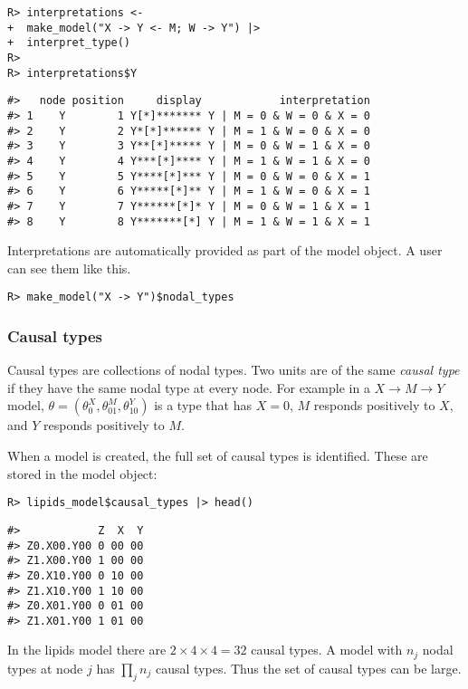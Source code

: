 \documentclass[
  11pt,
  article]{jss}
\begin{document}
\begin{verbatim}
R> interpretations <- 
+  make_model("X -> Y <- M; W -> Y") |> 
+  interpret_type()
R> 
R> interpretations$Y
\end{verbatim}

\begin{verbatim}
#>   node position     display            interpretation
#> 1    Y        1 Y[*]******* Y | M = 0 & W = 0 & X = 0
#> 2    Y        2 Y*[*]****** Y | M = 1 & W = 0 & X = 0
#> 3    Y        3 Y**[*]***** Y | M = 0 & W = 1 & X = 0
#> 4    Y        4 Y***[*]**** Y | M = 1 & W = 1 & X = 0
#> 5    Y        5 Y****[*]*** Y | M = 0 & W = 0 & X = 1
#> 6    Y        6 Y*****[*]** Y | M = 1 & W = 0 & X = 1
#> 7    Y        7 Y******[*]* Y | M = 0 & W = 1 & X = 1
#> 8    Y        8 Y*******[*] Y | M = 1 & W = 1 & X = 1
\end{verbatim}

Interpretations are automatically provided as part of the model object.
A user can see them like this.

\begin{verbatim}
R> make_model("X -> Y")$nodal_types
\end{verbatim}

\hypertarget{causal-types}{%
\subsubsection{Causal types}\label{causal-types}}

Causal types are collections of nodal types. Two units are of the same
\emph{causal type} if they have the same nodal type at every node. For
example in a \(X \rightarrow M \rightarrow Y\) model,
\(\theta = (\theta^X_0, \theta^M_{01}, \theta^Y_{10})\) is a type that
has \(X=0\), \(M\) responds positively to \(X\), and \(Y\) responds
positively to \(M\).

When a model is created, the full set of causal types is identified.
These are stored in the model object:

\begin{verbatim}
R> lipids_model$causal_types |> head()
\end{verbatim}

\begin{verbatim}
#>            Z  X  Y
#> Z0.X00.Y00 0 00 00
#> Z1.X00.Y00 1 00 00
#> Z0.X10.Y00 0 10 00
#> Z1.X10.Y00 1 10 00
#> Z0.X01.Y00 0 01 00
#> Z1.X01.Y00 1 01 00
\end{verbatim}

In the lipids model there are \(2\times 4\times 4 = 32\) causal types. A
model with \(n_j\) nodal types at node \(j\) has \(\prod_jn_j\) causal
types. Thus the set of causal types can be large.
\end{document}
